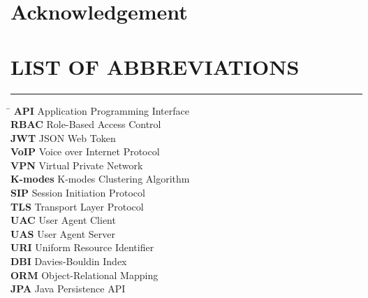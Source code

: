 \documentclass[12pt]{article}
\begin{document}


\renewcommand{\listfigurename}{LIST OF FIGURES}
\renewcommand{\cftloftitlefont}{\Large\bfseries} 
\renewcommand{\cftafterloftitle}{
    \par\noindent\vspace{-0.5em}
    \textcolor{blue}{\rule{\textwidth}{0.5pt}}
    \vspace{1em} 
}
\renewcommand{\cftfigpresnum}{Figure~}
\renewcommand{\cftfigaftersnum}{:}
\setlength{\cftfignumwidth}{5em}


\renewcommand{\contentsname}{\centering TABLE OF CONTENTS}
\begin{center}
    \tableofcontents
\end{center}
\newpage

\section*{Acknowledgement}


\newpage
\vspace{2em}
\section*{LIST OF ABBREVIATIONS}
\vspace{-0.9em}
\textcolor{blue}{\rule{\textwidth}{0.5pt}} 
\vspace{1em}
\begin{tabbing}
    \hspace{4cm} \= \hspace{10cm} \kill
    \textbf{API} \> Application Programming Interface \\
    \textbf{RBAC} \> Role-Based Access Control \\
    \textbf{JWT} \> JSON Web Token \\
    \textbf{VoIP} \> Voice over Internet Protocol \\
    \textbf{VPN} \> Virtual Private Network \\
    \textbf{K-modes} \> K-modes Clustering Algorithm \\
    \textbf{SIP} \> Session Initiation Protocol \\
    \textbf{TLS} \> Transport Layer Protocol \\
    \textbf{UAC} \> User Agent Client \\
    \textbf{UAS} \> User Agent Server \\
    \textbf{URI} \> Uniform Resource Identifier \\
    \textbf{DBI} \> Davies-Bouldin Index \\
    \textbf{ORM} \> Object-Relational Mapping \\
    \textbf{JPA} \> Java Persistence API
\end{tabbing}
\end{document}
